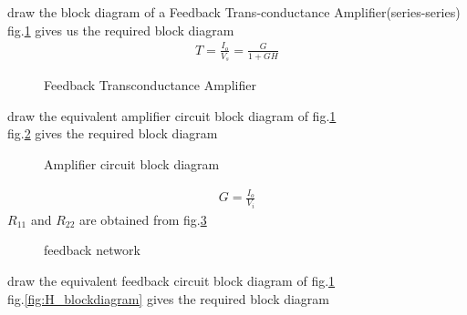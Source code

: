 \begin{enumerate}[label=\thesubsection.\arabic*.,ref=\thesubsection.\theenumi]
{\small
\item draw the block diagram of a Feedback Trans-conductance Amplifier(series-series)
\\
\solution fig.\ref{fig:trans-conductance_blockdiagram} gives us the required block diagram 
\begin{align}
    T=\frac{I_o}{V_s}=\frac{G}{1+GH}
\end{align}
\begin{figure}[!ht]
	\begin{center}
		
		\resizebox{\columnwidth}{!}{}
	\end{center}
\caption{Feedback Transconductance Amplifier}
\label{fig:trans-conductance_blockdiagram}
\end{figure}
\item draw the equivalent amplifier circuit block diagram of fig.\ref{fig:trans-conductance_blockdiagram} 
\\
\solution fig.\ref{fig:G_blockdiagram} gives the required block diagram 
\begin{figure}[!ht]
	\begin{center}
		
		\resizebox{\columnwidth}{!}{}
	\end{center}
\caption{Amplifier circuit  block diagram}
\label{fig:G_blockdiagram}
\end{figure}
\begin{align}
    G=\frac{I_o}{V_i}
\end{align}
$R_{11}$ and $R_{22}$ are  obtained from fig.\ref{fig:feedback_network}
\begin{figure}[!ht]
	\begin{center}
		
		\resizebox{\columnwidth}{!}{}
	\end{center}
\caption{feedback network}
\label{fig:feedback_network}
\end{figure}


\item draw the equivalent feedback circuit block diagram of fig.\ref{fig:trans-conductance_blockdiagram}
\\
\solution fig.\ref{fig:H_blockdiagram} gives the required block diagram
\begin{figure}[!ht]
	\begin{center}
		

\end{center}
\end{figure}}
\end{enumerate}
